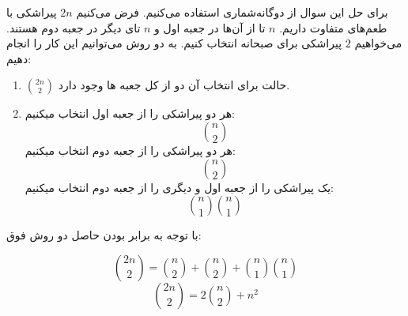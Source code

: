 \p
برای حل این سوال از دوگانه‌شماری استفاده می‌کنیم. فرض می‌کنیم 
$2n$
پیراشکی با طعم‌های متفاوت داریم.
$n$
تا از آن‌ها در جعبه اول و 
$n$
تای دیگر در جعبه دوم هستند. می‌خواهیم 
$2$
پیراشکی برای صبحانه انتخاب کنیم. به دو روش می‌توانیم این کار را انجام دهیم:
\begin{enumerate}
\item
$\binom{2n}{2}$
حالت برای انتخاب آن دو از کل جعبه ها وجود دارد.
\item
هر دو پیراشکی را از جعبه اول انتخاب میکنیم:
$$\binom{n}{2}$$
هر دو پیراشکی را از جعبه دوم انتخاب میکنیم:
$$\binom{n}{2}$$
یک پیراشکی را از جعبه اول و دیگری را از جعبه دوم انتخاب میکنیم:
$$\binom{n}{1}\binom{n}{1}$$

\end{enumerate}
با توجه به برابر بودن حاصل دو روش فوق:

$$\binom{2n}{2} = \binom{n}{2} + \binom{n}{2} + \binom{n}{1}\binom{n}{1}$$
$$\binom{2n}{2} = 2\binom{n}{2} + n^2$$